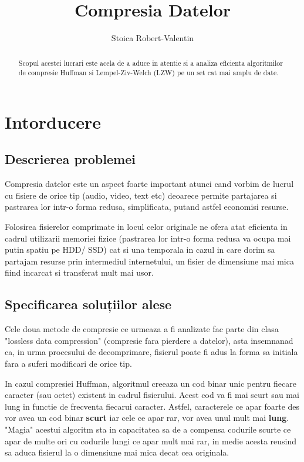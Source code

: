 \documentclass[runningheads]{llncs}
\begin{document}
\title{Compresia Datelor}
\author{Stoica Robert-Valentin}


\maketitle

\begin{abstract}
Scopul acestei lucrari este acela de a aduce in atentie si a analiza
eficienta algoritmilor de compresie Huffman si Lempel-Ziv-Welch (LZW)
pe un set cat mai amplu de date.

\end{abstract}



\section{Intorducere}

\subsection{Descrierea problemei}
Compresia datelor este un aspect foarte important atunci cand vorbim de
lucrul cu fisiere de orice tip (audio, video, text etc) deoarece permite
partajarea si pastrarea lor intr-o forma redusa, simplificata, putand astfel
economisi resurse.

Folosirea fisierelor comprimate in locul celor originale ne ofera atat eficienta
in cadrul utilizarii memoriei fizice (pastrarea lor intr-o forma redusa va ocupa
mai putin spatiu pe HDD/ SSD) cat si una temporala in cazul in care dorim sa
partajam resurse prin intermediul internetului, un fisier de dimensiune mai mica 
fiind incarcat si transferat mult mai usor.

\subsection{Specificarea soluțiilor alese}

Cele doua metode de compresie ce urmeaza a fi analizate fac parte din clasa
"lossless data compression" (compresie fara pierdere a datelor), asta insemnanad
ca, in urma procesului de decomprimare, fisierul poate fi adus la forma sa 
initiala fara a suferi modificari de orice tip.

In cazul compresiei Huffman, algoritmul creeaza un cod binar unic pentru fiecare
caracter (sau octet) existent in cadrul fisierului. Acest cod va fi mai scurt
sau mai lung in functie de frecventa fiecarui caracter.
Astfel, caracterele ce apar foarte des vor avea un cod binar \textbf{scurt} iar cele ce
apar rar, vor avea unul mult mai \textbf{lung}. "Magia" acestui algoritm sta in capacitatea
sa de a compensa codurile scurte ce apar de multe ori cu codurile lungi ce apar mult
mai rar, in medie acesta reusind sa aduca fisierul la o dimensiune mai mica decat cea
originala.
\end{document}
